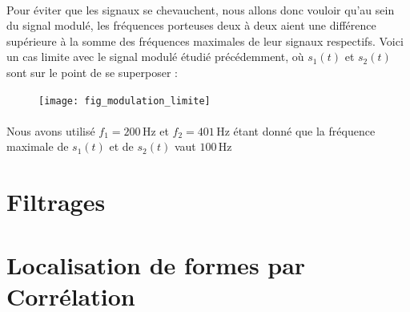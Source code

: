 \documentclass{article}
\begin{document}
\paragraph{}
Pour éviter que les signaux se chevauchent, nous allons donc vouloir qu'au sein du signal modulé, les fréquences porteuses deux à deux aient une différence supérieure à la somme des fréquences maximales de leur signaux respectifs.
\newpage
Voici un cas limite avec le signal modulé étudié précédemment, où $s_1(t)$ et $s_2(t)$ sont sur le point de se superposer :
\begin{figure}[h]
\texttt{[image: fig\_modulation\_limite]}
\centering
\end{figure}
\paragraph{}
Nous avons utilisé $f_1=200\,\mathrm{Hz}$ et $f_2=401\,\mathrm{Hz}$ étant donné que la fréquence maximale de $s_1(t)$ et de $s_2(t)$ vaut $100\,\mathrm{Hz}$

\section{Filtrages}
\section{Localisation de formes par Corrélation}
\end{document}
